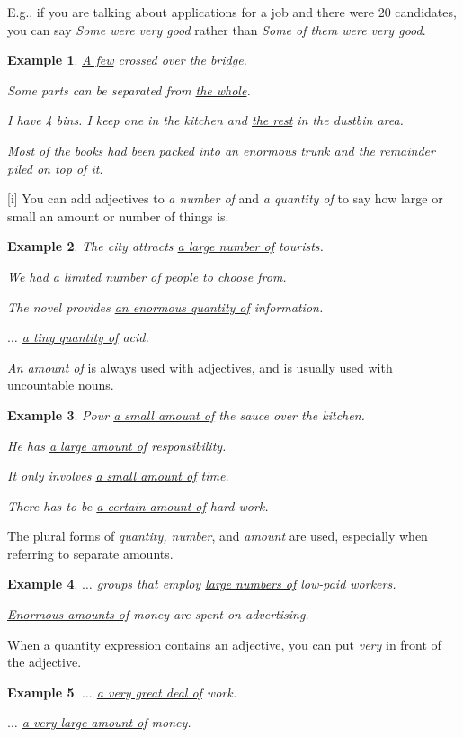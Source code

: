 \documentclass[oneside]{book}
\numberwithin{equation}{section}
\newtheorem{example}{Example}[section]
\begin{document}
E.g., if you are talking about applications for a job and there were 20 candidates, you can say \textit{Some were very good} rather than \textit{Some of them were very good}.
\begin{example}
    \underline{A few} crossed over the bridge.
    
    Some parts can be separated from \underline{the whole}.
    
    I have 4 bins. I keep one in the kitchen and \underline{the rest} in the dustbin area.
    
    Most of the books had been packed into an enormous trunk and \underline{the remainder} piled on top of it.
\end{example}
%
\noindent{} [i] You can add adjectives to \textit{a number of} and \textit{a quantity of} to say how large or small an amount or number of things is.
\begin{example}
    The city attracts \underline{a large number of} tourists.
    
    We had \underline{a limited number of} people to choose from.
    
    The novel provides \underline{an enormous quantity of} information.
    
    $\ldots$ \underline{a tiny quantity of} acid.
\end{example}
\textit{An amount of} is always used with adjectives, and is usually used with uncountable nouns.
\begin{example}
    Pour \underline{a small amount of} the sauce over the kitchen.
    
    He has \underline{a large amount of} responsibility.
    
    It only involves \underline{a small amount of} time.
    
    There has to be \underline{a certain amount of} hard work.
\end{example}
The plural forms of \textit{quantity, number}, and \textit{amount} are used, especially when referring to separate amounts.
\begin{example}
    $\ldots$ groups that employ \underline{large numbers of} low-paid workers.
    
    \underline{Enormous amounts of} money are spent on advertising.
\end{example}
%
\noindent{} When a quantity expression contains an adjective, you can put \textit{very} in front of the adjective.
\begin{example}
    $\ldots$ \underline{a very great deal of} work.
    
    $\ldots$ \underline{a very large amount of} money.
\end{example}
\end{document}
